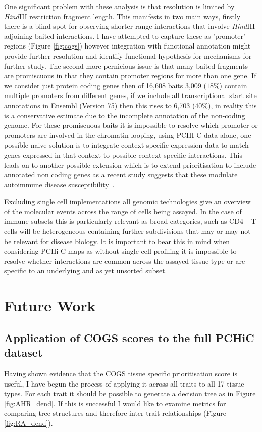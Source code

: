 \documentclass[a4paper,11pt]{report}
\begin{document}
One significant problem with these analysis is that resolution is limited by \textit{Hind}III restriction fragment length. This manifests in two main ways, firstly there is a blind spot for observing shorter range interactions that involve \textit{Hind}III adjoining baited interactions. I have attempted to capture these as 'promoter' regions (Figure \ref{fig:cogs}) however integration with functional annotation might provide further resolution and identify functional hypothesis for mechanisms for further study. The second more pernicious issue is that many baited fragments are promiscuous in that they contain promoter regions for more than one gene. If we consider just protein coding genes then of 16,608 baits 3,009 ($18\%$) contain multiple promoters from different genes, if we include all transcriptional start site annotations in Ensembl (Version 75) then this rises to 6,703 ($40\%$), in reality this is a conservative estimate due to the incomplete annotation of the non-coding genome. For these promiscuous baits it is impossible to resolve which promoter or promoters are involved in the chromatin looping, using PCHI-C data alone, one possible naive solution is to integrate context specific expression data to match genes expressed in that context to possible context specific interactions. This leads on to another possible extension which is to extend prioritisation to include annotated non coding genes as a recent study suggests that these modulate autoimmune disease susceptibility~\citep{Castellanos-RubioFernandez-JimenezKratchmarovEtAl2016}.

Excluding single cell implementations all genomic technologies give an overview of the molecular events across the range of cells being assayed. In the case of immune subsets this is particularly relevant as broad categories, such as CD4$+$ T cells will be heterogeneous containing further subdivisions that may or may not be relevant for disease biology. It is important to bear this in mind when considering PCHi-C maps as without single cell profiling it is impossible to resolve whether interactions are common across the assayed tissue type or are specific to an underlying and as yet unsorted subset.

\chapter{Future Work}

\section{Application of COGS scores to the full PCHiC dataset}
Having shown evidence that the COGS tissue specific prioritisation score is useful, I have begun the process of applying it across all traits to all 17 tissue types. For each trait it should be possible to generate a decision tree as in Figure \ref{fig:AHR_dend}. If this is successful I would like to examine metrics for comparing tree structures and therefore inter trait relationships (Figure \ref{fig:RA_dend}).
\end{document}
